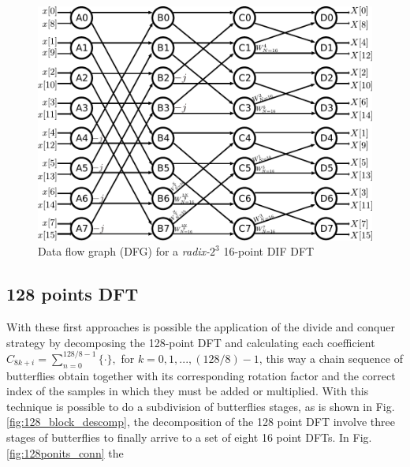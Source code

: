 \documentclass[journal,comsoc]{IEEEtran}
\begin{document}
\begin{figure}[ht]
	\centering
	\includegraphics[width=\linewidth]{Diagramas/miSeccionFiguras/16PuntosRadix8Burbujas.pdf}
	\caption{Data flow graph (DFG) for a \textit{radix-}$2^3$ 16-point DIF DFT}
	\label{fig:16points_dfg}
\end{figure}

\subsection{128 points DFT}
With these first approaches is possible the application of the divide and conquer strategy by decomposing the 128-point DFT and calculating each coefficient $C_{8k+i} = \sum_{n=0}^{128/8-1} \{ \cdot \}, $ for $k=0,1,...,(128/8)-1$, this way a  chain sequence of butterflies obtain together with its corresponding rotation factor and the correct index of the samples in which they must be added or multiplied. With this technique is possible to do a subdivision of butterflies stages, as is shown in Fig. \ref{fig:128_block_descomp}, the decomposition of the 128 point DFT involve three stages of butterflies to finally arrive to a set of eight 16 point DFTs. In Fig. \ref{fig:128ponits_conn} the 
\end{document}
